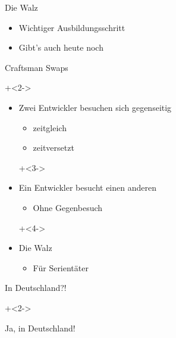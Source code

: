 \begin{frame}{Die Walz}

\begin{itemize}
\item Wichtiger Ausbildungsschritt

\item Gibt's auch heute noch
\end{itemize}

\end{frame}

\begin{frame}{Craftsman Swaps}

\onslide+<2->

\begin{itemize}
\item Zwei Entwickler besuchen sich gegenseitig
\begin{itemize}
\item zeitgleich
\item zeitversetzt
\end{itemize}

\onslide+<3->

\item Ein Entwickler besucht einen anderen
\begin{itemize}
\item Ohne Gegenbesuch
\end{itemize}

\onslide+<4->

\item Die Walz
\begin{itemize}
\item Für Serientäter
\end{itemize}

\end{itemize}

\end{frame}

\begin{frame}{In Deutschland?!}

\onslide+<2->

\begin{center}
\Large
Ja, in Deutschland!
\end{center}

\end{frame}

